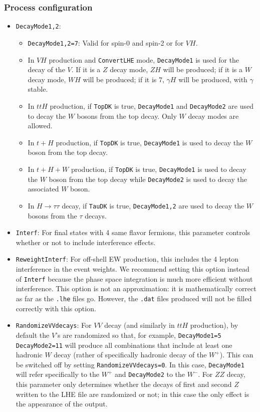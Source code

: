 \documentclass[aps,superscriptaddress,nofootinbib]{revtex4}
\begin{document}
\subsubsection{Process configuration}
\begin{itemize}
\item \verb|DecayMode1,2|:
\begin{itemize}
\item \verb|DecayMode1,2=7|: Valid for spin-0 and spin-2 or for $VH$.
\item In $VH$ production and \verb|ConvertLHE| mode, \verb|DecayMode1| is used for the decay of the $V$.  If it is a $Z$ decay mode, $ZH$ will be produced; if it is a $W$ decay mode, $WH$ will be produced; if it is $7$, $\gamma H$ will be produced, with $\gamma$ stable.
\item In $ttH$ production, if \verb|TopDK| is true, \verb|DecayMode1| and \verb|DecayMode2| are used to decay the $W$ bosons from the top decay.  Only $W$ decay modes are allowed.
\item In $t+H$ production, if \verb|TopDK| is true, \verb|DecayMode1| is used to decay the $W$ boson from the top decay.
\item In $t+H+W$ production, if \verb|TopDK| is true, \verb|DecayMode1| is used to decay the $W$ boson from the top decay while \verb|DecayMode2| is used to decay the associated $W$ boson.
\item In $H\to \tau\tau$ decay, if \verb|TauDK| is true, \verb|DecayMode1,2| are used to decay the $W$ bosons from the $\tau$ decays.
\end{itemize}
\item \verb|Interf|: For final states with 4 same flavor fermions, this parameter controls whether or not to include interference effects.
\item \verb|ReweightInterf|: For off-shell EW production, this includes the 4 lepton interference in the event weights.  We recommend setting this option instead of \texttt{Interf} because the phase space integration is much more efficient without interference.  This option is not an approximation: it is mathematically correct as far as the \texttt{.lhe} files go.  However, the \texttt{.dat} files produced will not be filled correctly with this option.
\item \verb|RandomizeVVdecays|: For $VV$ decay (and similarly in $ttH$ production), by default the $V$'s are randomized so that, for example, \verb|DecayMode1=5 DecayMode2=11| will produce all combinations that include at least one hadronic $W$ decay (rather of specifically hadronic decay of the $W^+$).  This can be switched off by setting \verb|RandomizeVVdecays=0|.  In this case, \verb|DecayMode1| will refer specifically to the $W^+$ and \verb|DecayMode2| to the $W^-$.  For $ZZ$ decay, this parameter only determines whether the decays of first and second $Z$ written to the LHE file are randomized or not; in this case the only effect is the appearance of the output.

\end{itemize}
\end{document}
